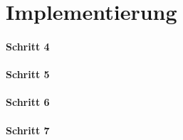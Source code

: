 
\part{Implementierung} 





\clearpage 



\clearpage
\subsection{Schritt 4}


\clearpage 
\subsection{Schritt 5}


\clearpage
\subsection{Schritt 6}


\clearpage
\subsection{Schritt 7}
